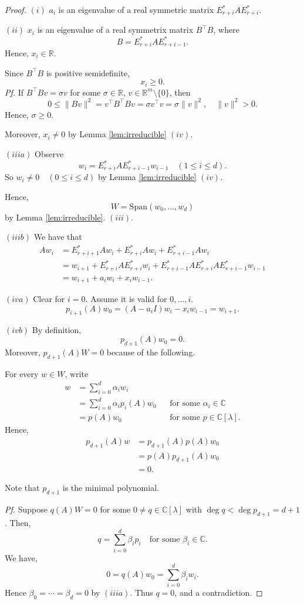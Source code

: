\documentclass[
]{book}
\theoremstyle{definition}
\theoremstyle{definition}
\theoremstyle{definition}
\theoremstyle{definition}
\theoremstyle{remark}
\begin{document}
\begin{proof}
\((i)\) \(a_i\) is an eigenvalue of a real symmetric matrix \(E_{r+i}^*AE^*_{r+i}\).

\((ii)\) \(x_i\) is an eigenvalue of a real symmetrix matrix \(B^\top B\), where
\[B = E^*_{r+i}AE^*_{r+i-1}.\]
Hence, \(x_i\in \mathbb{R}\).

Since \(B^\top B\) is positive semidefinite,
\[x_i \geq 0.\]
\emph{Pf.} If \(B^\top Bv = \sigma v\) for some \(\sigma \in \mathbb{R}\), \(v\in \mathbb{R}^m \setminus \{0\}\), then
\[0\leq \|Bv\|^2 = v^\top B^\top Bv = \sigma v^\top v = \sigma \|v\|^2, \quad \|v\|^2 >0.\]
Hence, \(\sigma \geq 0\).

Moreover, \(x_i\neq 0\) by Lemma \ref{lem:irreducible} \((iv)\).

\((iiia)\) Observe
\[w_i = E^*_{r+i}AE^*_{r+i-1}w_{i-1} \quad (1\leq i \leq d).\]
So \(w_i \neq 0 \quad (0\leq i \leq d)\) by Lemma \ref{lem:irreducible} \((iv)\).

Hence,
\[W = \mathrm{Span}(w_0, \ldots, w_d)\]
by Lemma \ref{lem:irreducible}. \((iii)\).

\((iiib)\) We have that
\begin{align}
Aw_i & = E^*_{r+i+1}Aw_i + E_{r+i}^*Aw_i + E^*_{r+i-1}Aw_i\\
& = w_{i+1} + E^*_{r+i}AE^*_{r+i}w_i + E^*_{r+i-1}AE^*_{r+i}AE^*_{r+i-1}w_{i-1}\\
& = w_{i+1} + a_iw_{i} + x_iw_{i-1}.
\end{align}

\((iva)\) Clear for \(i=0\). Assume it is valid for \(0, \ldots, i\).
\[p_{i+1}(A)w_0 = (A-a_iI)w_i - x_iw_{i-1} = w_{i+1}.\]

\((ivb)\) By definition,
\[p_{d+1}(A)w_0 = 0.\]
Moreover, \(p_{d+1}(A)W = 0\) because of the following.

For every \(w\in W\), write
\begin{align}
w & = \sum_{i=0}^d \alpha_i w_i \\
& = \sum_{i=0}^d \alpha_i p_i(A)w_0 && \text{for some }\alpha_i\in\mathbb{C}\\
& = p(A)w_0 && \text{for some }p\in \mathbb{C}[\lambda].
\end{align}
Hence,
\begin{align}
p_{d+1}(A)w & = p_{d+1}(A)p(A)w_0\\
& = p(A)p_{d+1}(A)w_0\\
& = 0.
\end{align}

Note that \(p_{d+1}\) is the minimal polynomial.

\emph{Pf.}
Suppose \(q(A)W = 0\) for some \(0\neq q\in \mathbb{C}[\lambda]\) with \(\deg q < \deg p_{d+1} = d+1\).
Then,
\[q = \sum_{i=0}^d\beta_ip_i \quad \text{for some }\beta_i\in \mathbb{C}.\]
We have,
\[0  = q(A)w_0  = \sum_{i=0}^d \beta_iw_i.\]
Hence \(\beta_0 = \cdots = \beta_d = 0\) by \((iiia)\). Thus \(q = 0\), and a contradiction.
\end{proof}
\end{document}
